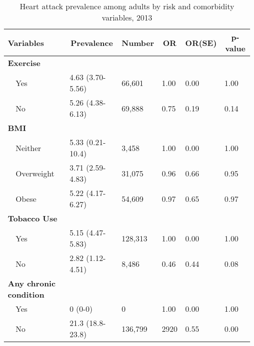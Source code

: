  
\begin{table}[H]
\caption{Heart attack prevalence  among adults by risk and comorbidity variables, 2013\label{tab:riskComo.tabl}} 
\begin{center}
\begin{tabular}{llllll}
\hline\hline
\multicolumn{1}{l}{Variables}&\multicolumn{1}{c}{Prevalence}&\multicolumn{1}{c}{Number}&\multicolumn{1}{c}{OR}&\multicolumn{1}{c}{OR(SE)}&\multicolumn{1}{c}{p-value}\tabularnewline
\hline
{\bfseries Exercise}&&&&&\tabularnewline
~~Yes&4.63 (3.70-5.56)&66,601&1.00&0.00&1.00\tabularnewline
~~No&5.26 (4.38-6.13)&69,888&0.75&0.19&0.14\tabularnewline
\hline
{\bfseries BMI}&&&&&\tabularnewline
~~Neither&5.33 (0.21-10.4)& 3,458&1.00&0.00&1.00\tabularnewline
~~Overweight&3.71 (2.59-4.83)&31,075&0.96&0.66&0.95\tabularnewline
~~Obese&5.22 (4.17-6.27)&54,609&0.97&0.65&0.97\tabularnewline
\hline
{\bfseries Tobacco Use}&&&&&\tabularnewline
~~Yes&5.15 (4.47-5.83)&128,313&1.00&0.00&1.00\tabularnewline
~~No&2.82 (1.12-4.51)&  8,486&0.46&0.44&0.08\tabularnewline
\hline
{\bfseries Any chronic condition}&&&&&\tabularnewline
~~Yes&0 (0-0)&      0&1.00&0.00&1.00\tabularnewline
~~No&21.3 (18.8-23.8)&136,799&2920&0.55&0.00\tabularnewline
\hline
\end{tabular}\end{center}

\end{table}

